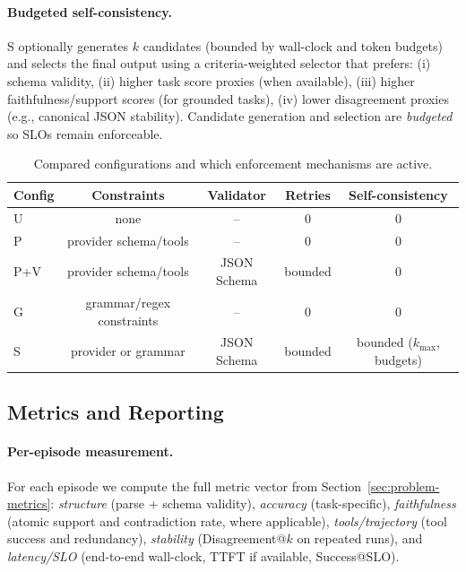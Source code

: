 \documentclass[11pt]{article}
\newcommand{\slo}{\ensuremath{\mathrm{SLO}}}
\begin{document}
\paragraph{Budgeted self-consistency.}
S optionally generates $k$ candidates (bounded by wall-clock and token budgets) and selects the final output using a criteria-weighted selector that prefers:
(i) schema validity,
(ii) higher task score proxies (when available),
(iii) higher faithfulness/support scores (for grounded tasks),
(iv) lower disagreement proxies (e.g., canonical JSON stability).
Candidate generation and selection are \emph{budgeted} so SLOs remain enforceable.

\begin{table}[t]
\centering
\small
\begin{tabular}{@{}lcccc@{}}
\toprule
\textbf{Config} & \textbf{Constraints} & \textbf{Validator} & \textbf{Retries} & \textbf{Self-consistency} \\
\midrule
U   & none & -- & 0 & 0 \\
P   & provider schema/tools & -- & 0 & 0 \\
P+V & provider schema/tools & JSON Schema & bounded & 0 \\
G   & grammar/regex constraints & -- & 0 & 0 \\
S   & provider or grammar & JSON Schema & bounded & bounded ($k_{\max}$, budgets) \\
\bottomrule
\end{tabular}
\caption{Compared configurations and which enforcement mechanisms are active.}
\label{tab:config-summary}
\end{table}

\subsection{Metrics and Reporting}
\label{sec:metrics-reporting}

\paragraph{Per-episode measurement.}
For each episode we compute the full metric vector from Section~\ref{sec:problem-metrics}:
\emph{structure} (parse + schema validity),
\emph{accuracy} (task-specific),
\emph{faithfulness} (atomic support and contradiction rate, where applicable),
\emph{tools/trajectory} (tool success and redundancy),
\emph{stability} (Disagreement@$k$ on repeated runs),
and \emph{latency/SLO} (end-to-end wall-clock, TTFT if available, Success@\slo).
\end{document}
